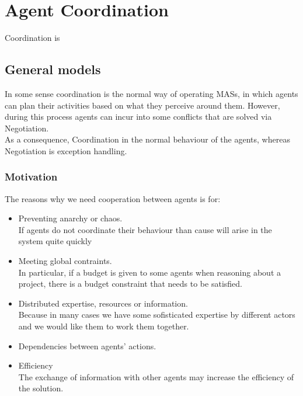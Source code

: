 

\chapter{Agent Coordination}
\minitoc

Coordination is 

\section{General models}
In some sense coordination is the normal way of operating MASs, in which agents can plan their activities based on what they perceive around them. However, during this process agents can incur into some conflicts that are solved via Negotiation.\\
As a consequence, Coordination in the normal behaviour of the agents, whereas Negotiation is exception handling.

\subsection{Motivation}
The reasons why we need cooperation between agents is for:
\begin{itemize}
\item Preventing anarchy or chaos.\\
If agents do not coordinate their behaviour than cause will arise in the system quite quickly
\item Meeting global contraints.\\
In particular, if a budget is given to some agents when reasoning about a project, there is a budget constraint that needs to be satisfied.
\item Distributed expertise, resources or information.\\
Because in many cases we have some sofisticated expertise by different actors and we would like them to work them together.
\item Dependencies between agents' actions.
\item Efficiency\\
The exchange of information with other agents may increase the efficiency of the solution.
\end{itemize}

